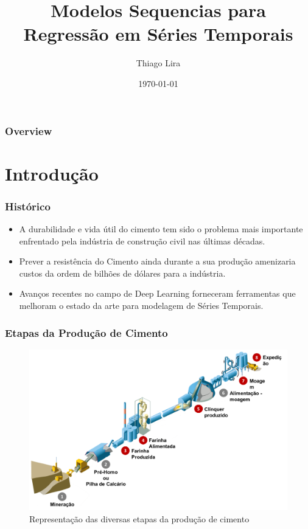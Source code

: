 \documentclass{beamer}
\title{Modelos Sequencias para Regressão em Séries Temporais} %
\author{Thiago Lira} %
\institute[IME-USP] %
{
Instituto de Matemática e Estatística - USP \\ %
\medskip
\textit{thlira15@gmail.com} %
}
\date{\today} %
\begin{document}
\begin{frame}
\titlepage %
\end{frame}

\begin{frame}
\frametitle{Overview} %
\tableofcontents %
\end{frame}


\section{Introdução}


\begin{frame}
\frametitle{Histórico}

\begin{itemize}
\item A durabilidade e vida útil do cimento tem sido o problema mais importante enfrentado
pela indústria de construção civil nas últimas décadas.
\item Prever a resistência do Cimento ainda durante a sua produção amenizaria
  custos da ordem de bilhões de dólares para a indústria.
\item Avanços recentes no campo de Deep Learning forneceram ferramentas que
  melhoram o estado da arte para modelagem de Séries Temporais.
\end{itemize}

\end{frame}



\begin{frame}
\frametitle{Etapas da Produção de Cimento}
\begin{figure}[H]
\centering
\includegraphics[scale=0.5]{cimento.png}
\caption{Representação das diversas etapas da produção de cimento}
\end{figure}
\end{frame}
\end{document}
